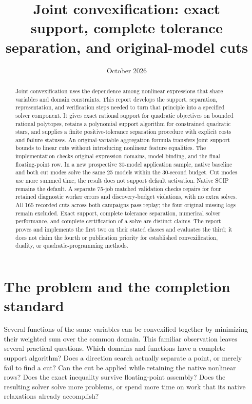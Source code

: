\documentclass[11pt]{article}
\title{Joint convexification: exact support, complete tolerance separation, and original-model cuts}
\author{}
\date{October 2026}
\theoremstyle{definition}
\theoremstyle{remark}
\begin{document}
\maketitle
\begin{abstract}
Joint convexification uses the dependence among nonlinear expressions that
share variables and domain constraints. This report develops the support,
separation, representation, and verification steps needed to turn that
principle into a specified solver component. It gives exact rational support
for quadratic objectives on bounded rational polytopes, retains a polynomial
support algorithm for constrained quadratic stars, and supplies a finite
positive-tolerance separation procedure with explicit costs and failure
statuses. An original-variable aggregation formula transfers joint support
bounds to linear cuts without introducing nonlinear feature equalities.
The implementation checks original expression domains, model binding, and
the final floating-point row. In a new prospective 30-model application
sample, native baseline and both cut modes solve the same 25 models within
the 30-second budget. Cut modes use more summed time; the result does not
support default activation. Native SCIP remains the default. A separate
75-job matched validation checks repairs for four retained diagnostic
worker errors and discovery-budget violations, with no extra solves.
All 165 recorded cuts across both campaigns pass replay; the four original
missing logs remain excluded. Exact support, complete
tolerance separation, numerical solver
performance, and complete certification of a solve are distinct claims.
The report proves and implements the first two on their stated classes and
evaluates the third; it does not claim the fourth or publication priority
for established convexification, duality, or quadratic-programming methods.
\end{abstract}
\tableofcontents

\section{The problem and the completion standard}\label{sec:scope}

Several functions of the same variables can be convexified together by
minimizing their weighted sum over the common domain. This familiar
observation leaves several practical questions. Which domains and functions
have a complete support algorithm? Does a direction search actually separate
a point, or merely fail to find a cut? Can the cut be applied while retaining
the native nonlinear rows? Does the exact inequality survive floating-point
assembly? Does the resulting solver solve more problems, or spend more time
on work that its native relaxations already accomplish?
\end{document}

